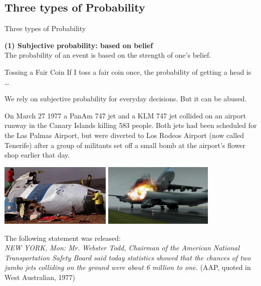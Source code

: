 \documentclass[t,xcolor=pdftex,dvipsnames,table]{beamer}
\begin{document}
\subsection[]{Three types of Probability}
\begin{frame}{Three types of Probability}

{\bf (1) Subjective probability: based on belief} \\
The probability of an event is based on the strength of one’s belief.

\vspace{.5cm}
\begin{block}{Tossing a Fair Coin}
If I toss a fair coin once, the probability of getting a head is … 
\end{block}
\end{frame}


\begin{frame}{}

We rely on subjective probability for everyday decisions. But it can be abused.

\vspace{.5cm}
On March 27 1977 a PanAm 747 jet and a KLM 747 jet collided on an airport
runway in the Canary Islands killing 583 people.  Both jets had been scheduled for the Las Palmas Airport, but were diverted to Los Rodeos Airport (now called Tenerife) after  a group of militants set off a small bomb at the airport’s flower shop earlier that day. 

\begin{center}
\includegraphics[height=3cm]{../images/Canary1.jpg}
\includegraphics[height=3cm]{../images/Canary2Animation.jpg}
\end{center}
\end{frame}

\begin{frame}{}
The following statement was released: \\

\vspace{.5cm}
{\it NEW YORK, Mon: Mr. Webster Todd, Chairman
of the American National Transportation Safety Board
said today statistics showed that the chances of two
jumbo jets colliding on the ground were about 6 million
to one.} (AAP, quoted in West Australian, 1977)
\end{frame}
\end{document}
